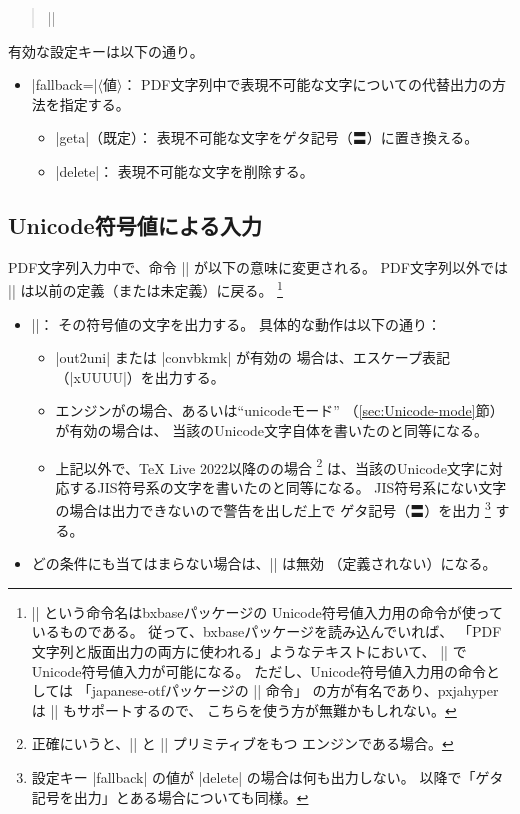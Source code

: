 \documentclass[uplatex,dvipdfmx,a4paper]{jsarticle}
\newcommand{\Pkg}[1]{\textsf{#1}}
\newcommand{\Meta}[1]{$\langle$\mbox{}#1\mbox{}$\rangle$}
\newcommand{\Means}{：\quad}
\begin{document}
\begin{quote}\small
|\pxjahypersetup{|\Meta{キー}|=|\Meta{値}|,...}|
\end{quote}

有効な設定キーは以下の通り。

\begin{itemize}
\item |fallback=|\Meta{値}\Means
  PDF文字列中で表現不可能な文字についての代替出力の方法を指定する。
  \begin{itemize}
  \item |geta|（既定）\Means
    表現不可能な文字をゲタ記号（〓）に置き換える。
  \item |delete|\Means
    表現不可能な文字を削除する。
  \end{itemize}
\end{itemize}

\subsection{Unicode符号値による入力}
\label{ssec:ux-command}

PDF文字列入力中で、命令 |\Ux| が以下の意味に変更される。
PDF文字列以外では |\Ux| は以前の定義（または未定義）に戻る。
\footnote{|\Ux| という命令名は\Pkg{bxbase}パッケージの
Unicode符号値入力用の命令が使っているものである。
従って、\Pkg{bxbase}パッケージを読み込んでいれば、
「PDF文字列と版面出力の両方に使われる」ようなテキストにおいて、
|\Ux| でUnicode符号値入力が可能になる。
ただし、Unicode符号値入力用の命令としては
「\Pkg{japanese-otf}パッケージの |\UTF| 命令」
の方が有名であり、\Pkg{pxjahyper}は |\UTF| もサポートするので、
こちらを使う方が無難かもしれない。}

\begin{itemize}
\item |\Ux{|\Meta{Unicode符号値16進}|}|\Means
  その符号値の文字を出力する。
  具体的な動作は以下の通り：
  \begin{itemize}
  \item |out2uni| または |convbkmk| が有効の
  場合は、エスケープ表記（|\0xUUUU|）を出力する。
  \item エンジンが{\upLaTeX}の場合、あるいは“unicodeモード”
  （\ref{sec:Unicode-mode}節）が有効の場合は、
  当該のUnicode文字自体を書いたのと同等になる。
  \item 上記以外で、{\TeX} Live 2022以降の{\pLaTeX}の場合
  \footnote{正確にいうと、|\Uchar| と |\ucs| プリミティブをもつ
    {\epTeX}エンジンである場合。}%
  は、当該のUnicode文字に対応するJIS符号系の文字を書いたのと同等になる。
  JIS符号系にない文字の場合は出力できないので警告を出しだ上で
  ゲタ記号（〓）を出力%
  \footnote{設定キー |fallback| の値が |delete| の場合は何も出力しない。
    以降で「ゲタ記号を出力」とある場合についても同様。}%
  する。
  \end{itemize}
  \item どの条件にも当てはまらない場合は、|\Ux| は無効
  （定義されない）になる。
\end{itemize}
\end{document}
